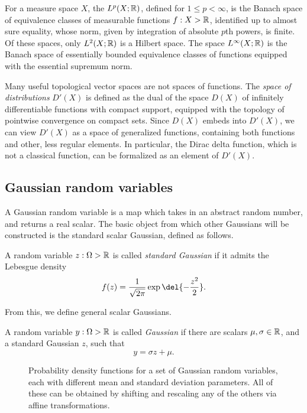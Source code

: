 \documentclass[11pt]{book}
\begin{document}
For a measure space $X$, the  $L^p(X;\mathbb{R})$, defined for $1 \leq p < \infty$, is the Banach space of equivalence classes of measurable functions $f : X \-> \mathbb{R}$, identified up to almost sure equality, whose norm, given by integration of absolute $p$th powers, is finite.
Of these spaces, only $L^2(X;\mathbb{R})$ is a Hilbert space.
The space $L^\infty(X;\mathbb{R})$ is the Banach space of essentially bounded equivalence classes of functions equipped with the essential supremum norm.

Many useful topological vector spaces are not spaces of functions.
The \emph{space of distributions} $D'(X)$ is defined as the dual of the space $D(X)$ of infinitely differentiable functions with compact support, equipped with the topology of pointwise convergence on compact sets.
Since $D(X)$ embeds into $D'(X)$, we can view $D'(X)$ as a space of generalized functions, containing both functions and other, less regular elements.
In particular, the Dirac delta function, which is not a classical function, can be formalized as an element of $D'(X)$.


\subsection{Gaussian random variables}

A Gaussian random variable is a map which takes in an abstract random number, and returns a real scalar.
The basic object from which other Gaussians will be constructed is the standard scalar Gaussian, defined as follows.

\begin{definition}
A random variable $z : \Omega\->\mathbb{R}$ is called \emph{standard Gaussian} if it admits the Lebesgue density
\[
f(z) = \frac{1}{\sqrt{2\pi}} \exp\del{-\frac{z^2}{2}}
.
\]
\end{definition}

From this, we define general scalar Gaussians.

\begin{definition}
A random variable $y : \Omega\->\mathbb{R}$ is called \emph{Gaussian} if there are scalars $\mu, \sigma\in\mathbb{R}$, and a standard Gaussian $z$, such that
\[
y = \sigma z + \mu
.
\]
\end{definition}


\begin{figure}

\caption{Probability density functions for a set of Gaussian random variables, each with different mean and standard deviation parameters. All of these can be obtained by shifting and rescaling any of the others via affine transformations.}
\end{figure}
\end{document}
